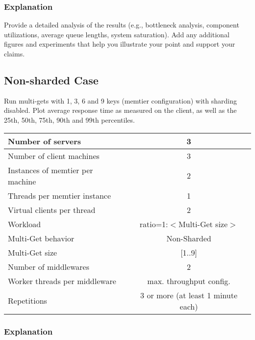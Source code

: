 \documentclass[11pt,a4paper]{article}
\begin{document}
\subsubsection{Explanation}

Provide a detailed analysis of the results (e.g., bottleneck analysis, component utilizations, average queue lengths, system saturation). Add any additional figures and experiments that help you illustrate your point and support your claims.

\subsection{Non-sharded Case}

Run multi-gets with 1, 3, 6 and 9 keys (memtier configuration) with sharding disabled. Plot average response time as measured on the client, as well as the 25th, 50th, 75th, 90th and 99th percentiles.

\begin{center}
	\scriptsize{
		\begin{tabular}{|l|c|}
			\hline Number of servers                & 3                       \\ 
			\hline Number of client machines        & 3                       \\ 
			\hline Instances of memtier per machine & 2                       \\ 
			\hline Threads per memtier instance     & 1                       \\
			\hline Virtual clients per thread       & 2                		 \\ 
			\hline Workload                         & ratio=1:$<$Multi-Get size$>$              \\
			\hline Multi-Get behavior               & Non-Sharded             \\
			\hline Multi-Get size                   & [1..9]                  \\
			\hline Number of middlewares            & 2                       \\
			\hline Worker threads per middleware    & max. throughput config. \\
			\hline Repetitions                      & 3 or more (at least 1 minute each)               \\ 
			\hline 
		\end{tabular}
	} 
\end{center}

\subsubsection{Explanation}
\end{document}
